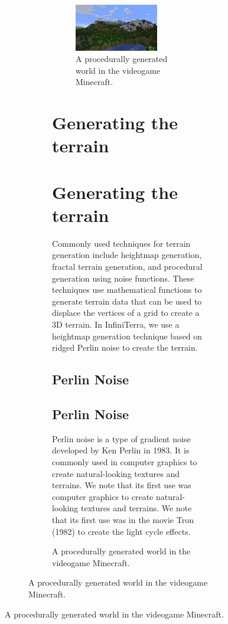 \documentclass{article}
\begin{document}
\begin{figure}[H]
\begin{figure}[H]
\begin{figure}[H]
\begin{figure}[H]
	\centering
	\includegraphics[width=0.75\textwidth]{img/minecraft.jpg}
	\caption{A procedurally generated world in the videogame Minecraft.}
	\label{fig:minecraft}
\end{figure}


\section{Generating the terrain}
\section{Generating the terrain}
\label{ch:generating-the-terrain}
Commonly used techniques for terrain generation include heightmap generation, fractal terrain
generation, and procedural generation using noise functions. These techniques use mathematical
functions to generate terrain data that can be used to displace the vertices of a grid to create a
3D terrain. In InfiniTerra, we use a heightmap generation technique based on ridged Perlin noise to
create the terrain.
\subsection{Perlin Noise}
\subsection{Perlin Noise}
Perlin noise is a type of gradient noise developed by Ken Perlin in 1983. It is commonly used in
computer graphics to create natural-looking textures and terrains. We note that its first use was
computer graphics to create natural-looking textures and terrains. We note that its first use was
in the movie Tron (1982) to create the light cycle effects.


\end{figure}
\end{figure}
\end{figure}
\end{document}
